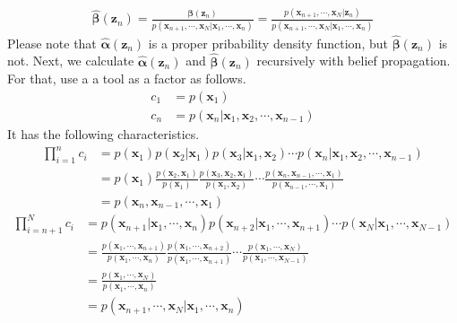 \documentclass[a4]{article}
\begin{document}
\begin{equation}
\begin{aligned}
    \bm{\hat{\beta}}(\bm{z}_n) = \frac{
        \bm{\beta}(\bm{z}_n)
    }
    {
        p( \bm{x}_{n+1}, \cdots, \bm{x}_{N}| \bm{x}_1, \cdots, \bm{x}_n )
    }
    = \frac{
        p( \bm{x}_{n+1}, \cdots, \bm{x}_N  | \bm{z}_n )
    }
    {
        p( \bm{x}_{n+1}, \cdots, \bm{x}_{N}| \bm{x}_1, \cdots, \bm{x}_n )
    }
\end{aligned}
\end{equation}
Please note that $\bm{\hat{\alpha}}(\bm{z}_n)$ is a proper pribability density function, but
$\bm{\hat{\beta}}(\bm{z}_n)$ is not.
Next, we calculate $\bm{\hat{\alpha}}(\bm{z}_n)$ and $\bm{\hat{\beta}}(\bm{z}_n)$ recursively
with belief propagation. For that, use a a tool as a factor as follows.
\begin{equation}
\begin{aligned}
c_1 &= p(\bm{x}_1)\\
c_n &= p(\bm{x}_n | \bm{x}_1, \bm{x}_2, \cdots, \bm{x}_{n-1})
\end{aligned}
\end{equation}
It has the following characteristics.
\begin{equation}
\begin{aligned}
\prod_{i=1}^n c_i &= p(\bm{x}_1) p(\bm{x}_2|\bm{x}_1) p(\bm{x}_3|\bm{x}_1, \bm{x}_2)\cdots
p(\bm{x}_n|\bm{x}_1, \bm{x}_2, \cdots, \bm{x}_{n-1})\\
 &= 
p(\bm{x}_1)
\frac{ p(\bm{x}_2, \bm{x}_1) }{ p(\bm{x}_1) }
\frac{ p(\bm{x}_3, \bm{x}_2, \bm{x}_1) }{ p(\bm{x}_1,  \bm{x}_2) }
\cdots
\frac{ p(\bm{x}_n, \bm{x}_{n-1},\cdots, \bm{x}_1) }{p(\bm{x}_{n-1},\cdots, \bm{x}_1) }\\
&= p(\bm{x}_n, \bm{x}_{n-1},\cdots, \bm{x}_1)
\end{aligned}
\end{equation}
\begin{equation}
\begin{aligned}
\prod_{i={n+1}}^N c_i
&=
p(\bm{x}_{n+1}|\bm{x}_1, \cdots, \bm{x}_n)
p(\bm{x}_{n+2}|\bm{x}_1, \cdots, \bm{x}_{n+1})
\cdots
p(\bm{x}_{N}|\bm{x}_1, \cdots, \bm{x}_{N-1})\\
&=
\frac{p(\bm{x}_1, \cdots, \bm{x}_{n+1})}{p(\bm{x}_1, \cdots, \bm{x}_{n})}
\frac{p(\bm{x}_1, \cdots, \bm{x}_{n+2})}{p(\bm{x}_1, \cdots, \bm{x}_{n+1})}
\cdots
\frac{p(\bm{x}_1, \cdots, \bm{x}_{N})}{p(\bm{x}_1, \cdots, \bm{x}_{N-1})}\\
&= \frac{p(\bm{x}_1, \cdots, \bm{x}_{N})}{p(\bm{x}_1, \cdots, \bm{x}_{n})}\\
&= p(\bm{x}_{n+1}, \cdots, \bm{x}_{N} | \bm{x}_1, \cdots, \bm{x}_{n})
\end{aligned}
\end{equation}
\end{document}
